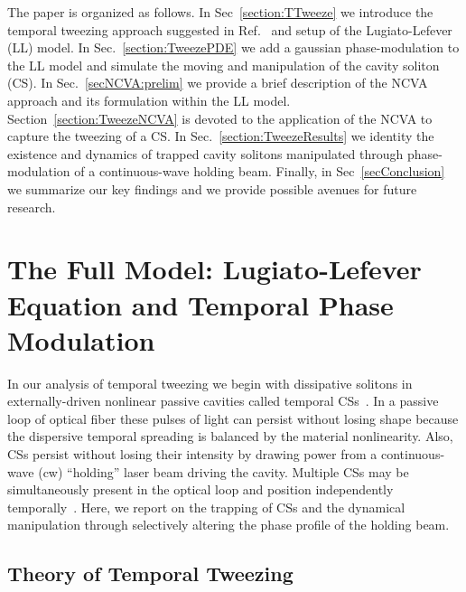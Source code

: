 \documentclass[aps,floatfix,showpacs,preprintnumbers,twocolumn,nofootinbib]{revtex4}
\begin{document}
The paper is organized as follows.  
%
In Sec~\ref{section:TTweeze} we introduce the temporal tweezing approach suggested in Ref.~\cite{tweeze} and setup of the Lugiato-Lefever (LL) model.  
%
In Sec.~\ref{section:TweezePDE} we add a gaussian phase-modulation to the LL model and simulate the moving and manipulation of the cavity soliton (CS).  
%
In Sec.~\ref{secNCVA:prelim} we provide a brief description of the NCVA approach and its formulation within the LL model.  Section~\ref{section:TweezeNCVA} is devoted to the application of the NCVA to capture the tweezing of a CS.  
%
In Sec.~\ref{section:TweezeResults} we identity the existence and dynamics of trapped cavity solitons manipulated through phase-modulation of a continuous-wave holding beam.  Finally, in Sec~\ref{secConclusion} we summarize our key findings and we provide possible avenues for future research.


\section{The Full Model: Lugiato-Lefever Equation and Temporal Phase Modulation
\label{section:TTweeze}}
In our analysis of temporal tweezing we begin with dissipative solitons in externally-driven nonlinear passive cavities called temporal CSs~\cite{XuCoenRef22a,XuCoenRef22b,info15,info17,info19,info21}.  In a passive loop of optical fiber these pulses of light can persist without losing shape because the dispersive temporal spreading is balanced by the material nonlinearity.   Also, CSs persist without losing their intensity by drawing power from a continuous-wave (cw) ``holding'' laser beam driving the cavity.  Multiple CSs may be simultaneously present in the optical loop and position independently temporally~\cite{info16}.  Here, we report on the trapping of CSs and the dynamical manipulation through selectively altering the phase profile of the holding beam.  

\subsection{Theory of Temporal Tweezing}  
\label{secTweezeTheroy}
\end{document}
